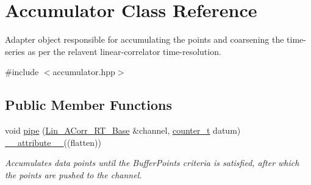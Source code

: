 \hypertarget{classAccumulator}{}\section{Accumulator Class Reference}
\label{classAccumulator}


Adapter object responsible for accumulating the points and coarsening the time-\/series as per the relavent linear-\/correlator time-\/resolution.  




{\ttfamily \#include $<$accumulator.\+hpp$>$}

\subsection*{Public Member Functions}
\begin{DoxyCompactItemize}
\item 
void \hyperlink{classAccumulator_aa1793bc1599bc2451fabc44954673164}{pipe} (\hyperlink{classLin__ACorr__RT__Base}{Lin\+\_\+\+A\+Corr\+\_\+\+R\+T\+\_\+\+Base} \&channel, \hyperlink{types_8hpp_ac89ac912f524b3e3fa3720ea55fec966}{counter\+\_\+t} datum) \hyperlink{utilities_8hpp_a103d5b3998e0dd804213c8f30a094f4d}{\+\_\+\+\_\+attribute\+\_\+\+\_\+}((flatten))
\begin{DoxyCompactList}\small\item\em Accumulates data points until the Buffer\+Points criteria is satisfied, after which the points are pushed to the channel. \end{DoxyCompactList}\end{DoxyCompactItemize}
